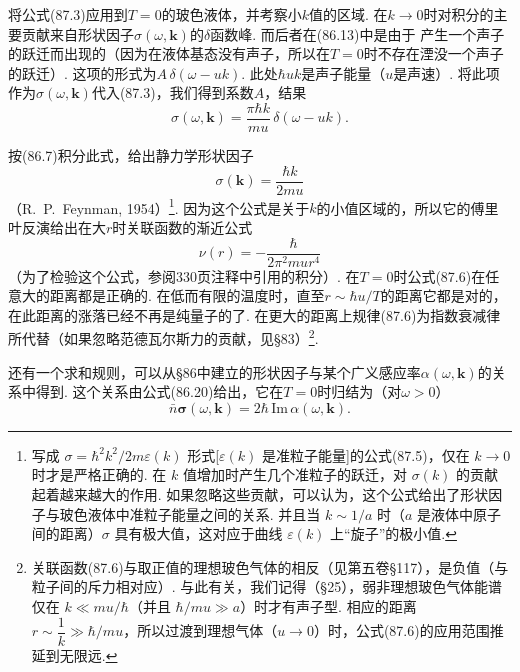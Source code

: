 将公式(87.3)应用到$T=0$的玻色液体，并考察小$k$值的区域. 在$k\to0$时对积分的主要贡献来自形状因子$\sigma(\omega,\bm{k})$的$\delta$函数峰. 而后者在(86.13)中是由于
产生一个声子的跃迁而出现的（因为在液体基态没有声子，所以在$T=0$时不存在湮没一个声子的跃迁）. 这项的形式为$A\,\delta(\omega-uk)$. 此处$\hbar uk$是声子能量（$u$是声速）. 将此项作为$\sigma(\omega,\bm{k})$代入(87.3)，我们得到系数$A$，结果
\begin{equation}
\sigma(\omega,\bm{k})=\frac{\pi\hbar k}{mu}\,\delta(\omega-uk).
\end{equation}

按(86.7)积分此式，给出静力学形状因子
\begin{equation}
\sigma(\bm{k})=\frac{\hbar k}{2mu}
\end{equation}
（R.~P.~Feynman, 1954）\footnote{写成 $\sigma=\hbar^{2}k^{2}/2m\varepsilon(k)$ 形式[$\varepsilon(k)$ 是准粒子能量]的公式(87.5)，仅在 $k\to 0$ 时才是严格正确的. 在 $k$ 值增加时产生几个准粒子的跃迁，对 $\sigma(k)$ 的贡献起着越来越大的作用. 如果忽略这些贡献，可以认为，这个公式给出了形状因子与玻色液体中准粒子能量之间的关系. 并且当 $k\sim 1/a$ 时（$a$ 是液体中原子间的距离）$\sigma$ 具有极大值，这对应于曲线 $\varepsilon(k)$ 上“旋子”的极小值.}. 因为这个公式是关于$k$的小值区域的，所以它的傅里叶反演给出在大$r$时关联函数的渐近公式
\begin{equation}
\nu(r)=-\frac{\hbar}{2\pi^{2}mur^{4}}
\end{equation}
（为了检验这个公式，参阅330页注释中引用的积分）. 在$T=0$时公式(87.6)在任意大的距离都是正确的. 在低而有限的温度时，直至$r\sim\hbar u/T$的距离它都是对的，在此距离的涨落已经不再是纯量子的了. 在更大的距离上规律(87.6)为指数衰减律所代替（如果忽略范德瓦尔斯力的贡献，见§83）\footnote{关联函数(87.6)与取正值的理想玻色气体的相反（见第五卷§117），是负值（与粒子间的斥力相对应）. 与此有关，我们记得（§25），弱非理想玻色气体能谱仅在 $k\ll mu/\hbar$（并且 $\hbar/mu\gg a$）时才有声子型. 相应的距离 $r\sim\dfrac{1}{k}\gg\hbar/mu$，所以过渡到理想气体（$u\to 0$）时，公式(87.6)的应用范围推延到无限远.}.

还有一个求和规则，可以从§86中建立的形状因子与某个广义感应率$\alpha(\omega,\bm{k})$的关系中得到. 这个关系由公式(86.20)给出，它在$T=0$时归结为（对$\omega>0$）
\begin{equation}
\bar{n}\bm{\sigma}(\omega,\bm{k})=2\hbar\,\mathrm{Im}\,\alpha(\omega,\bm{k}).
\end{equation}


